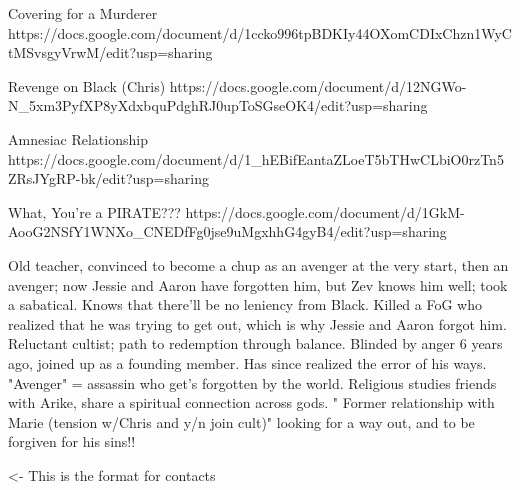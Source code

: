 \documentclass[char]{GL2020}
\begin{document}
Covering for a Murderer https://docs.google.com/document/d/1ccko996tpBDKIy44OXomCDIxChzn1WyCtMSvsgyVrwM/edit?usp=sharing

Revenge on Black (Chris)  https://docs.google.com/document/d/12NGWo-N_5xm3PyfXP8yXdxbquPdghRJ0upToSGseOK4/edit?usp=sharing

Amnesiac Relationship https://docs.google.com/document/d/1_hEBifEantaZLoeT5bTHwCLbiO0rzTn5ZRsJYgRP-bk/edit?usp=sharing

What, You're a PIRATE??? https://docs.google.com/document/d/1GkM-AooG2NSfY1WNXo_CNEDfFg0jse9uMgxhhG4gyB4/edit?usp=sharing  

Old teacher, convinced to become a chup as an avenger at the very start, then an avenger; now Jessie and Aaron have forgotten him, but Zev knows him well; took a sabatical. Knows that there'll be no leniency from Black. Killed a FoG who realized that he was trying to get out, which is why Jessie and Aaron forgot him.	Reluctant cultist; path to redemption through balance. Blinded by anger 6 years ago, joined up as a founding member. Has since realized the error of his ways. "Avenger" = assassin who get's forgotten by the world. Religious studies friends with Arike, share a spiritual connection across gods.	"
Former relationship with Marie (tension w/Chris and y/n join cult)"	looking for a way out, and to be forgiven for his sins!!


\begin{itemz}[Goals]
	\item 
\end{itemz}

\begin{itemz}[Notes]
	\item 
\end{itemz}

\begin{contacts}
	\contact{\cTest{}} <- This is the format for contacts 
\end{contacts}
\end{document}
